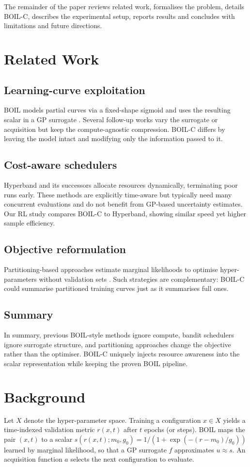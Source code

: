\documentclass{article} %
\begin{document}
The remainder of the paper reviews related work, formalises the problem, details BOIL-C, describes the experimental setup, reports results and concludes with limitations and future directions.

\section{Related Work}
\label{sec:related}
\subsection{Learning-curve exploitation}
BOIL models partial curves via a fixed-shape sigmoid and uses the resulting scalar in a GP surrogate \cite{nguyen-2019-bayesian}. Several follow-up works vary the surrogate or acquisition but keep the compute-agnostic compression. BOIL-C differs by leaving the model intact and modifying only the information passed to it.

\subsection{Cost-aware schedulers}
Hyperband and its successors allocate resources dynamically, terminating poor runs early. These methods are explicitly time-aware but typically need many concurrent evaluations and do not benefit from GP-based uncertainty estimates. Our RL study compares BOIL-C to Hyperband, showing similar speed yet higher sample efficiency.

\subsection{Objective reformulation}
Partitioning-based approaches estimate marginal likelihoods to optimise hyper-parameters without validation sets \cite{mlodozeniec-2023-hyperparameter}. Such strategies are complementary: BOIL-C could summarise partitioned training curves just as it summarises full ones.

\subsection{Summary}
In summary, previous BOIL-style methods ignore compute, bandit schedulers ignore surrogate structure, and partitioning approaches change the objective rather than the optimiser. BOIL-C uniquely injects resource awareness into the scalar representation while keeping the proven BOIL pipeline.

\section{Background}
\label{sec:background}
Let \(X\) denote the hyper-parameter space. Training a configuration \(x\in X\) yields a time-indexed validation metric \(r(x,t)\) after \(t\) epochs (or steps). BOIL maps the pair \((x,t)\) to a scalar \(s(r(x,t);m_0,g_0)=1/(1+\exp(-(r-m_0)/g_0))\) learned by marginal likelihood, so that a GP surrogate \(f\) approximates \(u\approx s\). An acquisition function \(a\) selects the next configuration to evaluate.
\end{document}
